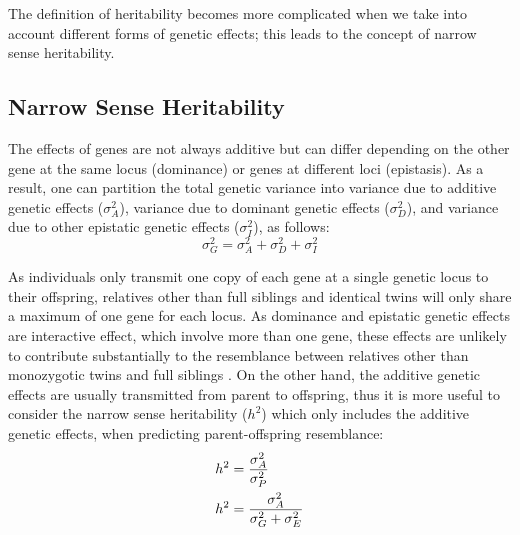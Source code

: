 	The definition of heritability becomes more complicated when we take into account different forms of genetic effects; this leads to the concept of narrow sense heritability.
	
	\subsection{Narrow Sense Heritability}
	The effects of genes are not always additive but can differ depending on the other gene at the same locus (dominance) or genes at different loci (epistasis).
	As a result, one can partition the total genetic variance into variance due to additive genetic effects ($\sigma_A^2$), variance due to dominant genetic effects ($\sigma_D^2$), and variance due to other epistatic genetic effects ($\sigma_I^2$), as follows:
	$$
	\sigma_G^2=\sigma_A^2+\sigma_D^2+\sigma_I^2
	$$
	
	As individuals only transmit one copy of each gene at a single genetic locus to their offspring, relatives other than full siblings and identical twins will only share a maximum of one gene for each locus.
	As dominance and epistatic genetic effects are interactive effect, which  involve more than one gene, these effects are unlikely to contribute substantially to the resemblance between relatives other than monozygotic twins and full siblings \citep{Visscher2008}.
	On the other hand, the additive genetic effects are usually transmitted from parent to offspring, thus it is more useful to consider the narrow sense heritability ($h^2$) which only includes the additive genetic effects, when predicting parent-offspring resemblance:
	\begin{align}
	h^2&=\frac{\sigma_A^2}{\sigma_P^2} \notag\\
	h^2&=\frac{\sigma_A^2}{\sigma_G^2+\sigma_E^2}
	\label{eq:narrowHeritability}
	\end{align}
	
